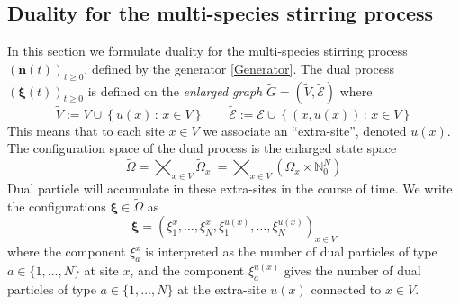 \documentclass[10pt]{article}
\numberwithin{equation}{section}
\numberwithin{equation}{subsection}
\begin{document}
\subsection{Duality for the multi-species stirring process}\label{statementDualitySubsection}
In this section we formulate duality for the multi-species stirring process $(\bm{n}(t))_{t\geq 0}$, defined by the generator \eqref{Generator}.
The dual  process $(\bm{\xi}(t))_{t\geq 0}$ is defined on the \textit{enlarged graph} $\widetilde{G}=(\widetilde{V},\widetilde{\mathcal{E}})$ where 
\begin{equation}
	\widetilde{V}:=V\cup \left\{u(x)\,:\, x\in V\right\}\qquad \widetilde{\mathcal{E}}:=\mathcal{E}\cup \left\{(x,u(x))\,:\, x\in V\right\}
\end{equation}
This means that to each site $x\in V$ we associate an ``extra-site'', denoted $u(x)$. The configuration space of the dual process is the enlarged state space
\begin{equation}\label{dualStateSpace}
    \widetilde{\Omega}= \bigtimes_{x\in V} \widetilde{\Omega}_{x}\ = \bigtimes_{x\in V} (\Omega_{x}\times \mathbb{N}_{0}^{N})
\end{equation}
Dual particle will accumulate in these extra-sites in the course of time. We write the configurations $\bm{\xi} \in \widetilde\Omega$  as
\begin{equation}
    \bm{\xi}=\left(\xi_{1}^{x},\ldots,\xi_{N}^{x},\xi_{1}^{u(x)},\ldots,\xi_{N}^{u(x)}\right)_{x\in V}
\end{equation}
where the component $\xi_{a}^{x}$ is interpreted as the number of dual particles of type $a\in \{1,\ldots,N\}$ at site $x$, 
and the component $\xi_{a}^{u(x)}$  gives the number of dual particles of type $a\in \{1,\ldots,N\}$ at 
the extra-site $u(x)$ connected to $x\in V$.
\end{document}
